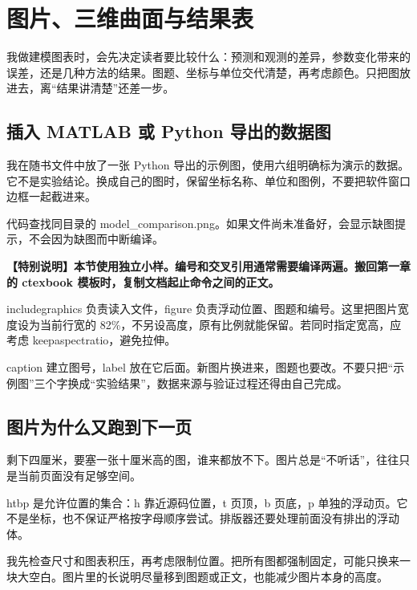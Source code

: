 \chapter{图片、三维曲面与结果表}

我做建模图表时，会先决定读者要比较什么：预测和观测的差异，参数变化带来的误差，还是几种方法的结果。图题、坐标与单位交代清楚，再考虑颜色。只把图放进去，离“结果讲清楚”还差一步。

\section{插入 MATLAB 或 Python 导出的数据图}

我在随书文件中放了一张 Python 导出的示例图，使用六组明确标为演示的数据。它不是实验结论。换成自己的图时，保留坐标名称、单位和图例，不要把软件窗口边框一起截进来。

代码查找同目录的 model\_comparison.png。如果文件尚未准备好，会显示缺图提示，不会因为缺图而中断编译。

\begin{tcolorbox}[colback=Teal!4,colframe=Teal,boxrule=.7pt,arc=1mm,fontupper=\small\bfseries]\textbf{【特别说明】本节使用独立小样。编号和交叉引用通常需要编译两遍。搬回第一章的 ctexbook 模板时，复制文档起止命令之间的正文。}\end{tcolorbox}


includegraphics 负责读入文件，figure 负责浮动位置、图题和编号。这里把图片宽度设为当前行宽的 82\%，不另设高度，原有比例就能保留。若同时指定宽高，应考虑 keepaspectratio，避免拉伸。

caption 建立图号，label 放在它后面。新图片换进来，图题也要改。不要只把“示例图”三个字换成“实验结果”，数据来源与验证过程还得由自己完成。

\section{图片为什么又跑到下一页}

剩下四厘米，要塞一张十厘米高的图，谁来都放不下。图片总是“不听话”，往往只是当前页面没有足够空间。

htbp 是允许位置的集合：h 靠近源码位置，t 页顶，b 页底，p 单独的浮动页。它不是坐标，也不保证严格按字母顺序尝试。排版器还要处理前面没有排出的浮动体。

我先检查尺寸和图表积压，再考虑限制位置。把所有图都强制固定，可能只换来一块大空白。图片里的长说明尽量移到图题或正文，也能减少图片本身的高度。

